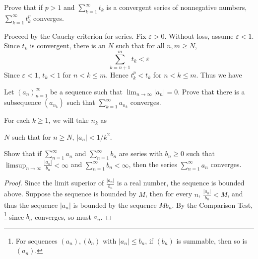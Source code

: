 \documentclass[../main.tex]{subfiles}
\begin{document}
\begin{problem}[\S3.1 C]
Prove that if $p > 1$ and $\sum_{k = 1}^\infty t_k$ is a convergent series of nonnegative numbers, $\sum_{k = 1}^\infty t_k^p$ converges.
\end{problem}
Proceed by the Cauchy criterion for series.
Fix $\varepsilon > 0$.
Without loss, assume $\varepsilon < 1$.
Since $t_k$ is convergent, there is an $N$ such that for all $n, m \ge N$,
\[
	\sum_{k = n + 1}^m t_k < \varepsilon
\]
Since $\varepsilon < 1$, $t_k < 1$ for $n < k \le m$.
Hence $t_k^p < t_k$ for $n < k \le m$.
Thus we have

\begin{problem}[\S3.1 D]
Let $(a_n)_{n = 1}^\infty$ be a sequence such that $\lim_{n \to \infty} |a_n| = 0$.
Prove that there is a subsequence $(a_{n_k})$ such that $\sum_{k = 1}^\infty a_{n_k}$ converges.
\end{problem}
For each $k \ge 1$, we will take $n_k$ as

$N$ such that for $n \ge N$, $|a_{n}| < 1/k^2$.

\begin{problem}[\S3.2 H]
Show that if $\sum_{n = 1}^\infty a_n$ and $\sum_{n = 1}^\infty b_n$ are series with $b_n \ge 0$ such that $\limsup_{n \to \infty} \frac{|a_n|}{b_n} < \infty$ and $\sum_{n = 1}^\infty b_n < \infty$, then the series $\sum_{n = 1}^\infty a_n$ converges.
\end{problem}

\begin{proof}
	Since the limit superior of $\frac{|a_n|}{b_n}$ is a real number, the sequence is bounded above.
	Suppose the sequence is bounded by $M$, then for every $n$, $\frac{|a_n|}{b_n} < M$, and thus the sequence $|a_n|$ is bounded by the sequence $M b_n$.
	By the Comparison Test,
	\footnote{For sequences $(a_n), (b_n)$ with $|a_n| \le b_n$, if $(b_n)$ is summable, then so is $(a_n)$.}
	since $b_n$ converges, so must $a_n$.
\end{proof}
\end{document}
